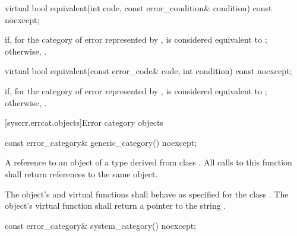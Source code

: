%
\begin{itemdecl}
virtual bool equivalent(int code, const error_condition& condition) const noexcept;
\end{itemdecl}

\begin{itemdescr}
\pnum
\returns {} if, for the category of error represented by ,  is considered equivalent to ; otherwise, .
\end{itemdescr}

%
\begin{itemdecl}
virtual bool equivalent(const error_code& code, int condition) const noexcept;
\end{itemdecl}

\begin{itemdescr}
\pnum
\returns {} if, for the category of error represented by ,  is considered equivalent to ; otherwise, .
\end{itemdescr}

[syserr.errcat.objects]{Error category objects}

%
\begin{itemdecl}
const error_category& generic_category() noexcept;
\end{itemdecl}

\begin{itemdescr}
\pnum
\returns A reference to an object of a type derived from class .
All calls to this function shall return references to the same object.

\pnum
\remarks The object's  and  virtual functions shall behave as specified for the class . The object's  virtual function shall return a pointer to the string .
\end{itemdescr}

%
\begin{itemdecl}
const error_category& system_category() noexcept;
\end{itemdecl}

